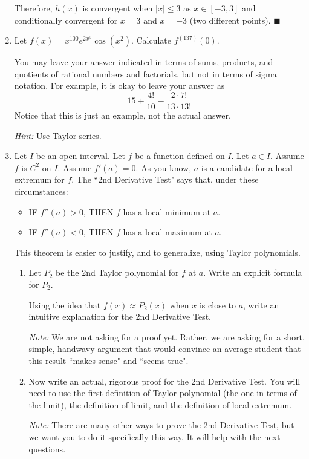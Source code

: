 \documentclass[12pt]{exam}
\newcommand {\DS} [1] {${\displaystyle #1}$}
\begin{document}
\begin{enumerate}
Therefore, $h(x)$ is convergent when $|x| \leq 3$ as $x\in[-3,3]$ and conditionally convergent for $x=3$ and $x=-3$ (two different points). $\blacksquare$

\newpage

\item Let \DS{f(x) = x^{100} e^{2x^5} \cos ( x^2) }.  Calculate \DS{f^{(137)}(0)}.   

You may leave your answer indicated in terms of sums, products, and quotients of rational numbers and factorials, but not in terms of sigma notation.  For example, it is okay to leave your answer as
	$$
		 15 + \frac{4!}{10} - \frac{2 \cdot 7!}{13 \cdot 13!}
	$$ 
Notice that this is just an example, not the actual answer.	

\emph{Hint:}  Use Taylor series.  


\item  Let $I$ be an open interval.    Let $f$ be a function defined on $I$.  Let $a \in I$.  Assume $f$ is $C^2$ on $I$.   Assume $f'(a) = 0$.   As you know, $a$ is a candidate for a local extremum for $f$.  The ``2nd Derivative Test" says that, under these circumstances:
	\begin{itemize}
		\item  IF $f''(a)>0$, THEN $f$ has a local minimum at $a$.
		\item  IF $f''(a)<0$, THEN $f$ has a local maximum at $a$.
	\end{itemize}
	 This theorem is easier to justify, and to generalize, using Taylor polynomials.
	\begin{enumerate}
		\item  \label{qu:int} Let $P_2$ be the 2nd Taylor polynomial for $f$ at $a$.  Write an explicit formula for $P_2$.
		
			Using the idea that $f(x) \approx P_2(x)$ when $x$ is close to $a$, write an intuitive explanation for the 2nd Derivative Test.  
			
			\emph{Note:}  We are not asking for a proof yet.  Rather, we are asking for a short, simple, handwavy argument that would convince an average student that this result ``makes sense" and ``seems true".
			
		\item  \label{qu:pf} Now write an actual, rigorous proof for the 2nd Derivative Test.  You will need to use the first definition of Taylor polynomial (the one in terms of the limit), the definition of limit, and the definition of local extremum.
				
			\emph{Note:}  There are many other ways to prove the 2nd Derivative Test, but we want you to do it specifically this way. It will help with the next questions.
	

\end{enumerate}
\end{enumerate}
\end{document}
